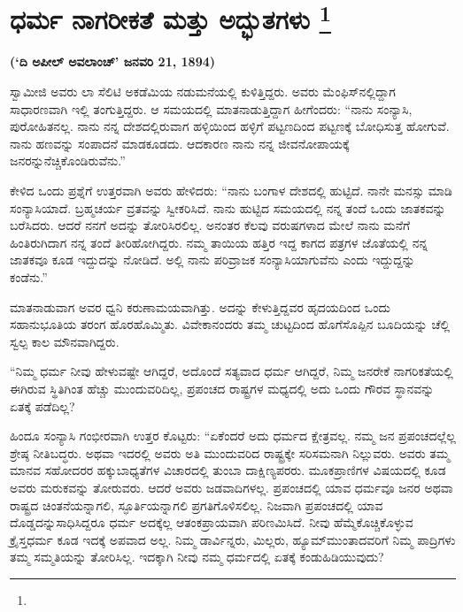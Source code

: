 
\chapter[ಧರ್ಮ ನಾಗರೀಕತೆ ಮತ್ತು ಅದ್ಭುತಗಳು ]{ಧರ್ಮ ನಾಗರೀಕತೆ ಮತ್ತು ಅದ್ಭುತಗಳು \protect\footnote{}}

\centerline{\textbf{(‘ದಿ ಅಪೀಲ್​ ಅವಲಾಂಚ್​’ ಜನವರಿ 21, 1894)}}

\vskip 3pt

ಸ್ವಾಮೀಜಿ ಅವರು ಲಾ ಸೆಲಿಟಿ ಅಕಡೆಮಿಯ ನಡುಮನೆಯಲ್ಲಿ ಕುಳಿತ್ತಿದ್ದರು. ಅವರು ಮೆಂಫಿಸ್​ನಲ್ಲಿದ್ದಾಗ ಸಾಧಾರಣವಾಗಿ ಇಲ್ಲಿ ತಂಗುತ್ತಿದ್ದರು. ಆ ಸಮಯದಲ್ಲಿ ಮಾತನಾಡುತ್ತಿದ್ದಾಗ ಹೀಗೆಂದರು: “ನಾನು ಸಂನ್ಯಾಸಿ, ಪುರೋಹಿತನಲ್ಲ. ನಾನು ನನ್ನ ದೇಶದಲ್ಲಿರುವಾಗ ಹಳ್ಳಿಯಿಂದ ಹಳ್ಳಿಗೆ ಪಟ್ಟಣದಿಂದ ಪಟ್ಟಣಕ್ಕೆ ಬೋಧಿಸುತ್ತ ಹೋಗುವೆ. ನಾನು ಹಣವನ್ನು ಸಂಪಾದನೆ ಮಾಡಕೂಡದು. ಆದಕಾರಣ ನಾನು ನನ್ನ ಜೀವನೋಪಾಯಕ್ಕೆ ಜನರನ್ನು\break ನೆಚ್ಚಿಕೊಂಡಿರುವೆನು.”

\vskip 3pt

ಕೇಳಿದ ಒಂದು ಪ್ರಶ್ನೆಗೆ ಉತ್ತರವಾಗಿ ಅವರು ಹೇಳಿದರು: “ನಾನು ಬಂಗಾಳ ದೇಶದಲ್ಲಿ ಹುಟ್ಟಿದೆ. ನಾನೇ ಮನಸ್ಸು ಮಾಡಿ ಸಂನ್ಯಾಸಿಯಾದೆ. ಬ್ರಹ್ಮಚರ್ಯ ವ್ರತವನ್ನು ಸ್ವೀಕರಿಸಿದೆ. ನಾನು ಹುಟ್ಟಿದ ಸಮಯದಲ್ಲಿ ನನ್ನ ತಂದೆ ಒಂದು ಜಾತಕವನ್ನು ಬರೆಸಿದರು. ಆದರೆ ನನಗೆ ಅದನ್ನು ತೋರಿಸಿರಲಿಲ್ಲ. ಅನಂತರ ಕೆಲವು ವರುಷಗಳಾದ ಮೇಲೆ ನಾನು ಮನೆಗೆ ಹಿಂತಿರುಗಿದಾಗ ನನ್ನ ತಂದೆ ತೀರಿಹೋಗಿದ್ದರು. ನಮ್ಮ ತಾಯಿಯ ಹತ್ತಿರ ಇದ್ದ ಕಾಗದ ಪತ್ರಗಳ ಜೊತೆಯಲ್ಲಿ ನನ್ನ ಜಾತಕವೂ ಕೂಡ ಇದ್ದುದನ್ನು ನೋಡಿದೆ. ಅಲ್ಲಿ ನಾನು ಪರಿವ್ರಾಜಕ ಸಂನ್ಯಾಸಿಯಾಗುವೆನು ಎಂದು ಇದ್ದುದ್ದನ್ನು ಕಂಡೆನು.”

\vskip 3pt

ಮಾತನಾಡುವಾಗ ಅವರ ಧ್ವನಿ ಕರುಣಾಮಯವಾಗಿತ್ತು. ಅದನ್ನು ಕೇಳುತ್ತಿದ್ದವರ ಹೃದಯದಿಂದ ಒಂದು ಸಹಾನುಭೂತಿಯ ತರಂಗ ಹೊರಹೊಮ್ಮಿತು. ವಿವೇಕಾನಂದರು ತಮ್ಮ ಚುಟ್ಟದಿಂದ ಹೊಗೆಸೊಪ್ಪಿನ ಬೂದಿಯನ್ನು ಚೆಲ್ಲಿ ಸ್ವಲ್ಪ ಕಾಲ ಮೌನವಾಗಿದ್ದರು.

\vskip 3pt

“ನಿಮ್ಮ ಧರ್ಮ ನೀವು ಹೇಳುವಷ್ಟೇ ಆಗಿದ್ದರೆ, ಅದೊಂದೆ ಸತ್ಯವಾದ ಧರ್ಮ ಆಗಿದ್ದರೆ, ನಿಮ್ಮ ಜನರೇಕೆ ನಾಗರಿಕತೆಯಲ್ಲಿ ಈಗಿರುವ ಸ್ಥಿತಿಗಿಂತ ಹೆಚ್ಚು ಮುಂದುವರಿದಿಲ್ಲ, ಪ್ರಪಂಚದ ರಾಷ್ಟ್ರಗಳ ಮಧ್ಯದಲ್ಲಿ ಅದು ಒಂದು ಗೌರವ ಸ್ಥಾನವನ್ನು ಏತಕ್ಕೆ ಪಡೆದಿಲ್ಲ?

\vskip 3pt

ಹಿಂದೂ ಸಂನ್ಯಾಸಿ ಗಂಭೀರವಾಗಿ ಉತ್ತರ ಕೊಟ್ಟರು: “ಏಕೆಂದರೆ ಅದು ಧರ್ಮದ ಕ್ಷೇತ್ರವಲ್ಲ. ನಮ್ಮ ಜನ ಪ್ರಪಂಚದಲ್ಲೆಲ್ಲ ಶ್ರೇಷ್ಠ ನೀತಿಬದ್ಧರು. ಅಥವಾ ಇದರಲ್ಲಿ ಅವರು ಅತಿ ಮುಂದುವರಿದ ರಾಷ್ಟ್ರಕ್ಕೇ ಸರಿಸಮನಾಗಿ ನಿಲ್ಲುವರು. ಅವರು ತಮ್ಮ ಮಾನವ ಸಹೋದರರ ಹಕ್ಕುಬಾಧ್ಯತೆಗಳ ವಿಚಾರದಲ್ಲಿ ತುಂಬಾ ದಾಕ್ಷಿಣ್ಯಪರರು. ಮೂಕಪ್ರಾಣಿಗಳ ವಿಷಯದಲ್ಲಿ ಕೂಡ ಅವರು ಮರುಕವನ್ನು ತೋರುವರು. ಆದರೆ ಅವರು ಜಡವಾದಿಗಳಲ್ಲ. ಪ್ರಪಂಚದಲ್ಲಿ ಯಾವ ಧರ್ಮವೂ ಜನರ ಅಥವಾ ರಾಷ್ಟ್ರದ ಚಿಂತನೆಯನ್ನಾಗಲಿ, ಸ್ಫೂರ್ತಿಯನ್ನಾಗಲಿ ಪ್ರಗತಿಗೊಳಿಸಲಿಲ್ಲ. ನಿಜವಾಗಿ ಪ್ರಪಂಚದಲ್ಲಿ ಯಾವ ದೊಡ್ಡದನ್ನು\break ಸಾಧಿಸಿದ್ದರೂ ಧರ್ಮ ಅದಕ್ಕೆಲ್ಲ ಆತಂಕಪ್ರಾಯವಾಗಿ ಪರಿಣಮಿಸಿದೆ. ನೀವು ಹೆಮ್ಮೆ\break ಕೊಚ್ಚಿಕೊಳ್ಳುವ ಕ್ರೈಸ್ತಧರ್ಮ ಕೂಡ ಇದಕ್ಕೆ ಅಪವಾದ ಅಲ್ಲ. ನಿಮ್ಮ ಡಾರ್ವಿನ್ನರು, ಮಿಲ್ಲರು, ಹ್ಯೂಮ್​ ಮುಂತಾದವರಿಗೆ ನಿಮ್ಮ ಪಾದ್ರಿಗಳು ತಮ್ಮ ಸಮ್ಮತಿಯನ್ನು ತೋರಿಸಿಲ್ಲ. ಇದಕ್ಕಾಗಿ ನೀವು ನಮ್ಮ ಧರ್ಮದಲ್ಲಿ ಏತಕ್ಕೆ ಕಂಡುಹಿಡಿಯುವುದು?

